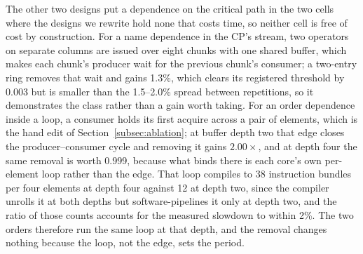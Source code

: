 The other two designs put a dependence on the critical path in the two cells where the designs we rewrite hold none that costs time, so neither cell is free of cost by construction.
For a name dependence in the CP's stream, two operators on separate columns are issued over eight chunks with one shared buffer, which makes each chunk's producer wait for the previous chunk's consumer; a two-entry ring removes that wait and gains 1.3\%, which clears its registered threshold by 0.003 but is smaller than the 1.5--2.0\% spread between repetitions, so it demonstrates the class rather than a gain worth taking.
For an order dependence inside a loop, a consumer holds its first acquire across a pair of elements, which is the hand edit of Section~\ref{subsec:ablation}; at buffer depth two that edge closes the producer--consumer cycle and removing it gains $2.00\times$, and at depth four the same removal is worth 0.999, because what binds there is each core's own per-element loop rather than the edge. That loop compiles to 38 instruction bundles per four elements at depth four against 12 at depth two, since the compiler unrolls it at both depths but software-pipelines it only at depth two, and the ratio of those counts accounts for the measured slowdown to within 2\%. The two orders therefore run the same loop at that depth, and the removal changes nothing because the loop, not the edge, sets the period.

